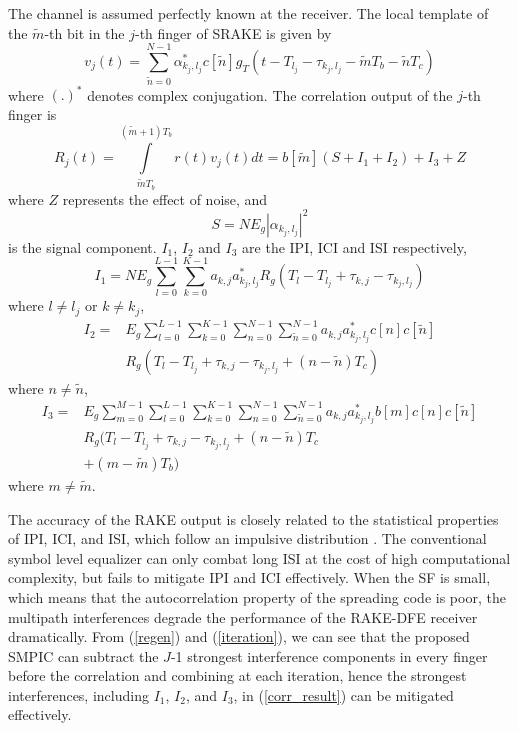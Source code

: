 \documentclass[journal]{IEEEtran}
\begin{document}
The channel is assumed perfectly known at the receiver. The local
template of the $\widetilde{m}$-th bit in the $j$-th finger of SRAKE
is given by
\begin{equation}
\label{template}
v_j(t)=\sum\limits_{\widetilde{n}=0}^{N-1}\alpha_{k_j,l_j}^*c[\widetilde{n}]g_T(t-T_{l_j}-\tau_{k_j,l_j}-\widetilde{m}T_b-\widetilde{n}T_c)
\end{equation}
where $(.)^*$ denotes complex conjugation. The correlation output of the $j$-th finger is
\begin{equation}
\label{corr_result}
R_j(t)=\int\limits_{\widetilde{m}T_b}^{(\widetilde{m}+1)T_b}r(t)v_j(t)dt
=b[\widetilde{m}](S+I_1+I_2)+I_3+Z
\end{equation}
where $Z$ represents the effect of noise, and
\begin{equation}
\label{signal} S= NE_g|\alpha_{k_j,l_j}|^2
\end{equation}
is the signal component. $I_1$, $I_2$ and $I_3$ are the IPI, ICI and
ISI respectively,
\begin{equation}
\label{IPI} I_1 =
NE_g\sum\limits_{l=0}^{L-1}\sum\limits_{k=0}^{K-1}a_{k,j}a_{k_j,l_j}^*R_g(T_l-T_{l_j}+\tau_{k,j}-\tau_{k_j,l_j})
\end{equation}
where $l\neq l_j$ or $k \neq k_j$,
\begin{equation}
\label{ICI}
\begin{aligned}
I_2=
&E_g\sum\limits_{l=0}^{L-1}\sum\limits_{k=0}^{K-1}\sum\limits_{n=0}^{N-1}\sum\limits_{\widetilde{n}=0}^{N-1}a_{k,j}a_{k_j,l_j}^*c[n]c[\widetilde{n}]\\
&R_g(T_l-T_{l_j}+\tau_{k,j}-\tau_{k_j,l_j}+(n-\widetilde{n})T_c)
\end{aligned}
\end{equation}
where $n\neq \widetilde{n}$,
\begin{equation}
\label{ISI}
\begin{aligned}
I_3=
&E_g\sum\limits_{m=0}^{M-1}\sum\limits_{l=0}^{L-1}\sum\limits_{k=0}^{K-1}\sum\limits_{n=0}^{N-1}\sum\limits_{\widetilde{n}=0}^{N-1}a_{k,j}a_{k_j,l_j}^*b[m]c[n]c[\widetilde{n}]\\
&R_g(T_l-T_{l_j}+\tau_{k,j}-\tau_{k_j,l_j}+(n-\widetilde{n})T_c\\
&+(m-\widetilde{m})T_b)
\end{aligned}
\end{equation}
where $m\neq \widetilde{m}$.

The accuracy of the RAKE output is closely related to the
statistical properties of IPI, ICI, and ISI, which follow an
impulsive distribution \cite{Interference ICC}. The conventional
symbol level equalizer can only combat long ISI at the cost of high
computational complexity, but fails to mitigate IPI and ICI
effectively. When the SF is small, which means that the
autocorrelation property of the spreading code is poor, the
multipath interferences degrade the performance of the RAKE-DFE
receiver dramatically. From (\ref{regen}) and (\ref{iteration}), we
can see that the proposed SMPIC can subtract the $J$-1 strongest
interference components in every finger before the correlation and
combining at each iteration, hence the strongest interferences,
including $I_1$, $I_2$, and $I_3$, in (\ref{corr_result}) can be
mitigated effectively.
\end{document}
